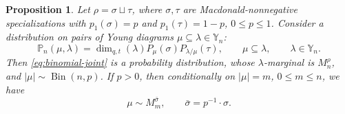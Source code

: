 \documentclass[11pt,reqno]{amsart}
\newtheorem{proposition}[theorem]{Proposition}
\theoremstyle{definition}
\theoremstyle{remark}
\numberwithin{equation}{section}
\newcommand{\Y}{\mathbb Y}
\newcommand{\Prob}{\mathbb P}
\newcommand{\ddim}{\operatorname{dim}_{q,t}}
\DeclareMathOperator{\Bin}{Bin}
\begin{document}
\begin{proposition}\label{Proposition_binomial}
Let $\rho=\sigma\sqcup\tau$, where $\sigma,\tau$ are Macdonald-nonnegative
specializations with $p_1(\sigma)=p$ and $p_1(\tau)=1-p$, $0\le p\le 1$.
Consider a distribution on pairs of Young diagrams $\mu\subseteq\lambda\in\Y_n$:
\begin{equation}\label{eq:binomial-joint}
 \Prob_n(\mu,\lambda)
 =\ddim(\lambda)P_\mu(\sigma)P_{\lambda/\mu}(\tau), \qquad \mu\subseteq\lambda, \qquad \lambda\in \Y_n.
\end{equation}
Then \eqref{eq:binomial-joint} is a probability distribution, whose $\lambda$-marginal is $M_n^\rho$, and $|\mu|\sim\Bin(n,p)$.
If $p>0$, then conditionally on $|\mu|=m$, $0\le m \le n$, we have
\begin{equation}\label{eq:binomial-conditional}
 \mu\sim M_m^{\bar\sigma},\qquad \bar\sigma=p^{-1}\cdot\sigma.
\end{equation}
\end{proposition}
\end{document}
